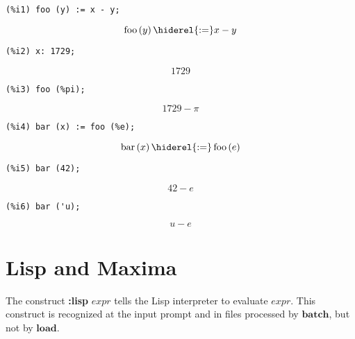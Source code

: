 \documentclass[12pt,leqno]{article}
\begin{document}
\begin{enumerate}
\begin{verbatim}
(%i1) foo (y) := x - y;
\end{verbatim}
\begin{dmath}[number={\(\mathop{\mathrm{\%o}_{1}}\)}]
\mathop{\mathrm{foo}}\left(y\right) \hiderel{:=} x-y
\end{dmath}
\begin{verbatim}
(%i2) x: 1729;
\end{verbatim}
\begin{dmath}[number={\(\mathop{\mathrm{\%o}_{2}}\)}]
1729
\end{dmath}
\begin{verbatim}
(%i3) foo (%pi);
\end{verbatim}
\begin{dmath}[number={\(\mathop{\mathrm{\%o}_{3}}\)}]
1729-\pi
\end{dmath}
\begin{verbatim}
(%i4) bar (x) := foo (%e);
\end{verbatim}
\begin{dmath}[number={\(\mathop{\mathrm{\%o}_{4}}\)}]
\mathop{\mathrm{bar}}\left(x\right) \hiderel{:=} \mathop{\mathrm{foo}}\left(e\right)
\end{dmath}
\begin{verbatim}
(%i5) bar (42);
\end{verbatim}
\begin{dmath}[number={\(\mathop{\mathrm{\%o}_{5}}\)}]
42-e
\end{dmath}
\begin{verbatim}
(%i6) bar ('u);
\end{verbatim}
\begin{dmath}[number={\(\mathop{\mathrm{\%o}_{6}}\)}]
u-e
\end{dmath}


\end{enumerate}

\section{Lisp and Maxima}


The construct {\bf :lisp} $\mathit{expr}$ tells the Lisp interpreter
to evaluate $\mathit{expr}$.
This construct is recognized at the input prompt and in files processed by $\mathbf{batch}$,
but not by $\mathbf{load}$.
\end{document}
